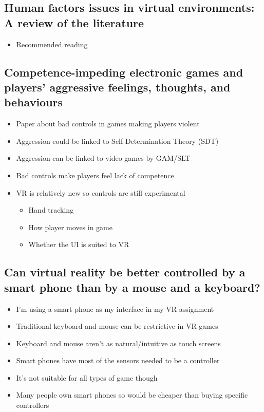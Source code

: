 \documentclass{scrartcl}
\begin{document}
\subsection{Human factors issues in virtual environments: A review of the literature \cite{stanney}}

\begin{itemize}
	\item Recommended reading 	
\end{itemize}

\subsection{Competence-impeding electronic games and players’ aggressive feelings, thoughts, and behaviours \cite{przybylski}}

\begin{itemize}
	\item Paper about bad controls in games making players violent 
	\item Aggression could be linked to Self-Determination Theory (SDT) 
	\item Aggression can be linked to video games by GAM/SLT
	\item Bad controls make players feel lack of competence
	\item VR is relatively new so controls are still experimental
	\begin{itemize}
		\item Hand tracking
		\item How player moves in game
		\item Whether the UI is suited to VR
	\end{itemize}	
\end{itemize}

\subsection{Can virtual reality be better controlled by a smart phone than by a mouse and a keyboard? \cite{Kovarova}}

\begin{itemize}
	\item I'm using a smart phone as my interface in my VR assignment	
	\item Traditional keyboard and mouse can be restrictive in VR games
	\item Keyboard and mouse aren't as natural/intuitive as touch screens
	\item Smart phones have most of the sensors needed to be a controller 
	\item It's not suitable for all types of game though
	\item Many people own smart phones so would be cheaper than buying specific controllers
\end{itemize}


	


	
\end{document}
